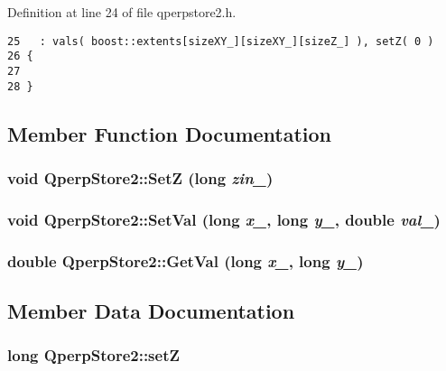 Definition at line 24 of file qperpstore2.h.

\begin{Code}\begin{verbatim}25   : vals( boost::extents[sizeXY_][sizeXY_][sizeZ_] ), setZ( 0 )
26 {
27 
28 }
\end{verbatim}
\end{Code}




\subsection{Member Function Documentation}
\subsubsection{\setlength{\rightskip}{0pt plus 5cm}void QperpStore2::SetZ (long {\em zin\_\-})\hspace{0.3cm}{\tt  [inline]}}\label{classQperpStore2_ba8224f96c07dd83816fecad90070d29}


\subsubsection{\setlength{\rightskip}{0pt plus 5cm}void QperpStore2::SetVal (long {\em x\_\-}, long {\em y\_\-}, double {\em val\_\-})}\label{classQperpStore2_c0a299f6580dc44dd2025645e720a55c}


\subsubsection{\setlength{\rightskip}{0pt plus 5cm}double QperpStore2::GetVal (long {\em x\_\-}, long {\em y\_\-})}\label{classQperpStore2_afdbee7b4d126315bab26b1436e77db2}




\subsection{Member Data Documentation}
\subsubsection{\setlength{\rightskip}{0pt plus 5cm}long {\bf QperpStore2::setZ}\hspace{0.3cm}{\tt  [private]}}\label{classQperpStore2_1e56964ca66d38009dbf2dd386ed5f95}




